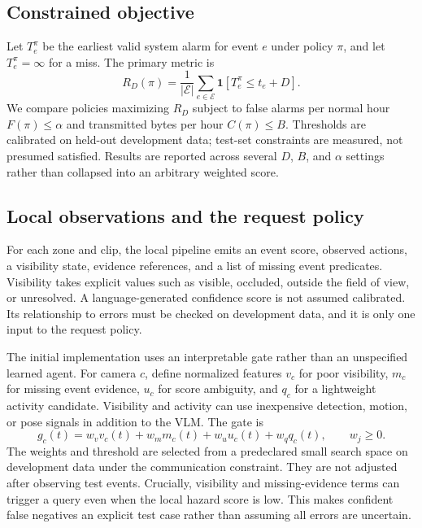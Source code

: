 \documentclass[10pt,a4paper]{article}
\newcommand{\E}{\mathcal{E}}
\newcommand{\ind}{\mathbf{1}}
\begin{document}
\subsection{Constrained objective}
Let $T_e^\pi$ be the earliest valid system alarm for event $e$ under policy $\pi$, and let $T_e^\pi=\infty$ for a miss. The primary metric is
\begin{equation}
 R_D(\pi)=\frac{1}{|\E|}\sum_{e\in\E}\ind[T_e^\pi\leq t_e+D].
\end{equation}
We compare policies maximizing $R_D$ subject to false alarms per normal hour $F(\pi)\leq\alpha$ and transmitted bytes per hour $C(\pi)\leq B$. Thresholds are calibrated on held-out development data; test-set constraints are measured, not presumed satisfied. Results are reported across several $D$, $B$, and $\alpha$ settings rather than collapsed into an arbitrary weighted score.

\newpage
\subsection{Local observations and the request policy}
For each zone and clip, the local pipeline emits an event score, observed actions, a visibility state, evidence references, and a list of missing event predicates. Visibility takes explicit values such as visible, occluded, outside the field of view, or unresolved. A language-generated confidence score is not assumed calibrated. Its relationship to errors must be checked on development data, and it is only one input to the request policy.

The initial implementation uses an interpretable gate rather than an unspecified learned agent. For camera $c$, define normalized features $v_c$ for poor visibility, $m_c$ for missing event evidence, $u_c$ for score ambiguity, and $q_c$ for a lightweight activity candidate. Visibility and activity can use inexpensive detection, motion, or pose signals in addition to the VLM. The gate is
\begin{equation}
 g_c(t)=w_vv_c(t)+w_mm_c(t)+w_uu_c(t)+w_qq_c(t),\qquad w_j\geq0.
\end{equation}
The weights and threshold are selected from a predeclared small search space on development data under the communication constraint. They are not adjusted after observing test events. Crucially, visibility and missing-evidence terms can trigger a query even when the local hazard score is low. This makes confident false negatives an explicit test case rather than assuming all errors are uncertain.
\end{document}
